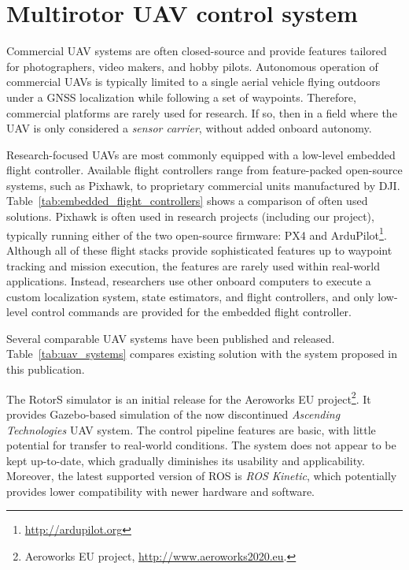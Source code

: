 \documentclass[a4paper,11pt,twoside,openright]{book}
\begin{document}

\section{Multirotor UAV control system}

Commercial \ac{UAV} systems are often closed-source and provide features tailored for photographers, video makers, and hobby pilots.
Autonomous operation of commercial \acp{UAV} is typically limited to a single aerial vehicle flying outdoors under a \ac{GNSS} localization while following a set of waypoints.
Therefore, commercial platforms are rarely used for research.
If so, then in a field where the \ac{UAV} is only considered a \emph{sensor carrier}, without added onboard autonomy.

Research-focused \acp{UAV} are most commonly equipped with a low-level embedded flight controller.
Available flight controllers \cite{ebeid2018survey} range from feature-packed open-source systems, such as Pixhawk, to proprietary commercial units manufactured by DJI.
Table~\ref{tab:embedded_flight_controllers} shows a comparison of often used solutions.
Pixhawk is often used in research projects (including our project), typically running either of the two open-source firmware: PX4 \cite{meier2015px4} and ArduPilot\footnote{\url{http://ardupilot.org}}.
Although all of these flight stacks provide sophisticated features up to waypoint tracking and mission execution, the features are rarely used within real-world applications.
Instead, researchers use other onboard computers to execute a custom localization system, state estimators, and flight controllers, and only low-level control commands are provided for the embedded flight controller.

Several comparable \ac{UAV} systems have been published and released.
Table~\ref{tab:uav_systems} compares existing solution with the system proposed in this publication.

The RotorS \cite{furrer2016rotors} simulator is an initial release for the Aeroworks EU project\footnote{Aeroworks EU project, \url{http://www.aeroworks2020.eu}.}.
It provides Gazebo-based simulation of the now discontinued \emph{Ascending Technologies} \ac{UAV} system.
The control pipeline features are basic, with little potential for transfer to real-world conditions.
The system does not appear to be kept up-to-date, which gradually diminishes its usability and applicability.
Moreover, the latest supported version of ROS is \emph{ROS Kinetic}, which potentially provides lower compatibility with newer hardware and software.
\end{document}
